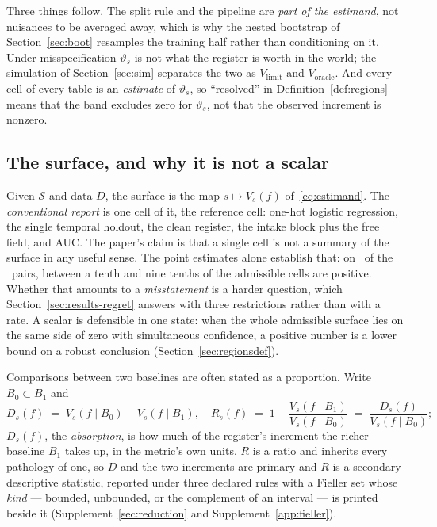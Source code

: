\noindent Three things follow. The split rule and the pipeline are
\emph{part of the estimand}, not nuisances to be averaged away, which is why
the nested bootstrap of Section~\ref{sec:boot} resamples the training half
rather than conditioning on it. Under misspecification $\vartheta_s$ is not
what the register is worth in the world; the simulation of
Section~\ref{sec:sim} separates the two as $V_{\mathrm{limit}}$ and
$V_{\mathrm{oracle}}$. And every cell of every table is an \emph{estimate} of
$\vartheta_s$, so ``resolved'' in Definition~\ref{def:regions} means that the
band excludes zero for $\vartheta_s$, not that the observed increment is
nonzero.

\subsection{The surface, and why it is not a scalar}

Given $\mathcal{S}$ and data $D$, the surface is the map $s \mapsto V_s(f)$
of~\eqref{eq:estimand}. The \emph{conventional report} is one cell of it, the
reference cell: one-hot logistic regression, the single temporal holdout, the
clean register, the intake block plus the free field, and AUC. The paper's
claim is that a single cell is not a summary of the surface in any useful
sense. The point estimates alone establish that: on \nSignVaries\ of the
\nPairs\ pairs, between a tenth and nine tenths of the admissible cells are
positive. Whether that amounts to a \emph{misstatement} is a harder question,
which Section~\ref{sec:results-regret} answers with three restrictions rather
than with a rate. A scalar is defensible in one state: when the whole
admissible surface lies on the same side of zero with simultaneous
confidence, a positive number is a lower bound on a robust conclusion
(Section~\ref{sec:regionsdef}).

Comparisons between two baselines are often stated as a proportion. Write
$B_0 \subset B_1$ and
\begin{equation}
D_s(f) \;=\; V_s(f \mid B_0) - V_s(f \mid B_1),
\quad
R_s(f) \;=\; 1 - \frac{V_s(f \mid B_1)}{V_s(f \mid B_0)}
\;=\; \frac{D_s(f)}{V_s(f \mid B_0)} ;
\label{eq:reduction}
\end{equation}
$D_s(f)$, the \emph{absorption}, is how much of the register's increment the
richer baseline $B_1$ takes up, in the metric's own units. $R$ is a ratio and
inherits every pathology of one, so $D$ and the two increments are primary
and $R$ is a secondary descriptive statistic, reported under three declared
rules with a Fieller set \citep{fieller1954} whose \emph{kind} --- bounded,
unbounded, or the complement of an interval --- is printed beside it
(Supplement~\ref{sec:reduction} and Supplement~\ref{app:fieller}).

